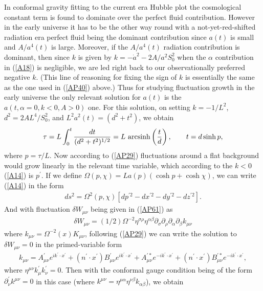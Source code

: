 In conformal gravity fitting to the current era Hubble plot the cosmological constant term is found to dominate over the perfect fluid contribution. However in the early universe it has to be the other way round with a not-yet-red-shifted radiation era perfect fluid being the dominant contribution since $a(t)$ is small and $A/a^4(t)$ is large. Moreover, if the $A/a^4(t)$ radiation contribution is dominant, then since $k$ is given by $k=-\dot{a}^2-2A/a^2S_0^2$ when the $\alpha$ contribution in (\ref{A18}) is negligible, we are led right back to our observationally  preferred negative $k$. (This line of reasoning for  fixing the sign of $k$ is essentially the same as the one  used in (\ref{AP40}) above.) Thus for studying fluctuation growth in the early universe the only relevant solution for $a(t)$ is the $a(t,\alpha=0,k<0,A>0)$ one. For this solution, on setting $k=-1/L^2$, $d^2=2AL^4/S_0^2$, and $L^2a^2(t)=(d^2+t^2)$, we obtain
%
\begin{eqnarray}
\tau=L\int_0^t \frac{dt}{(d^2+t^2)^{1/2}}=L~{\rm arc sinh}\left(\frac{t}{d}\right),\qquad t=d\sinh p,
\label{B1}
\end{eqnarray}
%
where $p=\tau/L$. Now according to (\ref{AP29}) fluctuations around a flat background would grow linearly in the relevant time variable, which according to the $k<0$ (\ref{A14}) is $p^{\prime}$. If we define $\Omega(p,\chi)=La(p)(\cosh p+\cosh \chi)$, we can write (\ref{A14}) in the form
%
\begin{eqnarray}
ds^2=\Omega^2(p,\chi)\left[dp^{\prime 2}-dx^{\prime 2} -dy^{\prime 2} -dz^{\prime 2}\right].
\label{B2}
\end{eqnarray}
%
And with fluctuation $\delta W_{\mu\nu}$ being given in (\ref{AP61}) as 
%
\begin{eqnarray}
\delta W_{\mu\nu}=(1/2)\Omega^{-2}\eta^{\sigma\rho}\eta^{\alpha\beta}\partial_{\sigma}\partial_{\rho} \partial_{\alpha}\partial_{\beta}k_{\mu\nu}
\end{eqnarray}
%
 where $k_{\mu\nu}=\Omega^{-2}(x)K_{\mu\nu}$, following
(\ref{AP29}) we can write the solution to $\delta W_{\mu\nu}=0$ in the primed-variable form
%
\begin{eqnarray}
k_{\mu\nu}=A^{\prime}_{\mu\nu}e^{ik^{\prime}\cdot x^{\prime}}+(n^{\prime}\cdot x^{\prime})B^{\prime}_{\mu\nu}e^{ik^{\prime}\cdot x^{\prime}}+A^{\prime *}_{\mu\nu}e^{-ik^{\prime}\cdot x^{\prime}}+(n^{\prime}\cdot x^{\prime})B^{\prime *}_{\mu\nu}e^{-ik^{\prime}\cdot x^{\prime}},
\label{B3}
\end{eqnarray}
%
where $\eta^{\mu\nu}k^{\prime}_{\mu}k^{\prime}_{\nu}=0$. Then with the conformal gauge condition being of the form $\partial^{\prime}_{\nu}k^{\mu\nu}=0$ in this case (where $k^{\mu\nu}=\eta^{\mu\alpha}\eta^{\nu\beta}k_{\alpha\beta}$), we obtain 
